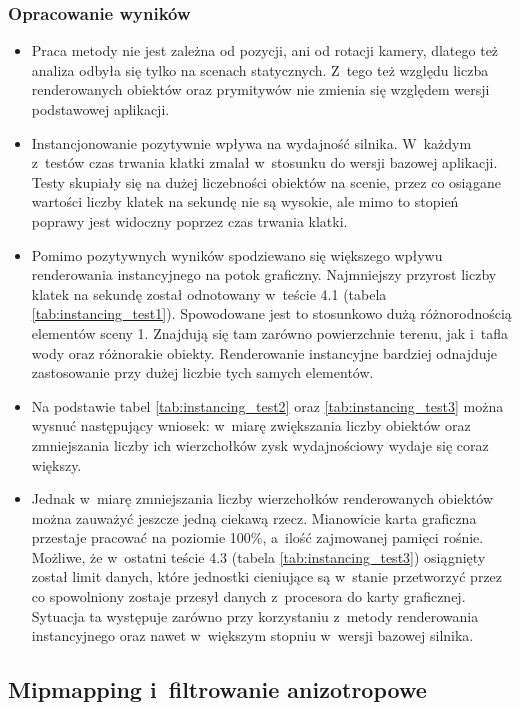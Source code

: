 \documentclass[a4paper,twoside,12pt]{book}
\begin{document}
\subsubsection{Opracowanie wyników}
\begin{itemize}
    \item Praca metody nie jest zależna od pozycji, ani od rotacji kamery, dlatego też analiza odbyła się tylko na scenach statycznych. Z~tego też względu liczba renderowanych obiektów oraz prymitywów nie zmienia się względem wersji podstawowej aplikacji.
    \item Instancjonowanie pozytywnie wpływa na wydajność silnika. W~każdym z~testów czas trwania klatki zmalał w~stosunku do wersji bazowej aplikacji. Testy skupiały się na dużej liczebności obiektów na scenie, przez co osiągane wartości liczby klatek na sekundę nie są wysokie, ale mimo to stopień poprawy jest widoczny poprzez czas trwania klatki.
    \item Pomimo pozytywnych wyników spodziewano się większego wpływu renderowania instancyjnego na potok graficzny. Najmniejszy przyrost liczby klatek na sekundę został odnotowany w~teście 4.1 (tabela \ref{tab:instancing_test1}). Spowodowane jest to stosunkowo dużą różnorodnością elementów sceny 1. Znajdują się tam zarówno powierzchnie terenu, jak i~tafla wody oraz różnorakie obiekty. Renderowanie instancyjne bardziej odnajduje zastosowanie przy dużej liczbie tych samych elementów.
    \item Na podstawie tabel \ref{tab:instancing_test2} oraz \ref{tab:instancing_test3} można wysnuć następujący wniosek: w~miarę zwiększania liczby obiektów oraz zmniejszania liczby ich wierzchołków zysk wydajnościowy wydaje się coraz większy.
    \item Jednak w~miarę zmniejszania liczby wierzchołków renderowanych obiektów można zauważyć jeszcze jedną ciekawą rzecz. Mianowicie karta graficzna przestaje pracować na poziomie 100\%, a~ilość zajmowanej pamięci rośnie. Możliwe, że w~ostatni teście 4.3 (tabela \ref{tab:instancing_test3}) osiągnięty został limit danych, które jednostki cieniujące są w~stanie przetworzyć przez co spowolniony zostaje przesył danych z~procesora do karty graficznej. Sytuacja ta występuje zarówno przy korzystaniu z~metody renderowania instancyjnego oraz nawet w~większym stopniu w~wersji bazowej silnika.
\end{itemize}



\subsection{Mipmapping i~filtrowanie anizotropowe}
\end{document}
